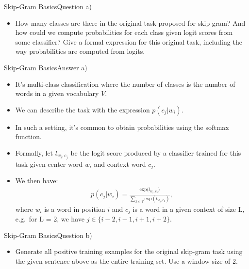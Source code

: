 \documentclass[t]{beamer}
\begin{document}
\begin{frame}{Skip-Gram Basics}{Question a)}
    \begin{itemize}
        \item How many classes are there in the original task proposed for
              skip-gram? And how could we compute probabilities for each class
              given logit scores from some classifier? Give a formal expression
              for this original task, including the way probabilities are
              computed from logits.
    \end{itemize}
\end{frame}

\begin{frame}{Skip-Gram Basics}{Answer a)}
    \begin{itemize}
        \item It's multi-class classification where the number of classes is the
              number of words in a given vocabulary $V$.
        \item We can describe the task with the expression $p(c_j|w_i)$.
        \item In such a setting, it's common to obtain probabilities using the
              softmax function.
        \item Formally, let $l_{w_i,c_j}$ be the logit score produced by a
              classifier trained for this task given center word $w_i$ and
              context word $c_j$.
        \item We then have:
              \begin{align*}
                  p(c_j|w_i) = \frac{\text{exp}{(l_{w_i,c_j}})}{\sum_{k\in V}\text{exp}(l_{w_i,c_k})},
              \end{align*}
              where $w_i$ is a word in position $i$ and $c_j$ is a word in a
              given context of size L, e.g.\ for L = 2, we have
              $j\in\{i-2, i-1,i+1,i+2\}$.
    \end{itemize}
\end{frame}

\begin{frame}{Skip-Gram Basics}{Question b)}
    \begin{itemize}
        \item Generate all positive training examples for the original skip-gram
              task using the given sentence above as the entire training set.
              Use a window size of 2.
    \end{itemize}
\end{frame}
\end{document}
